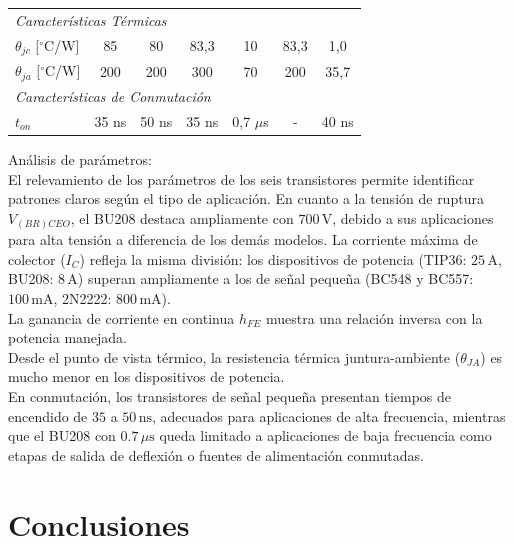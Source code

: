 \documentclass[12pt,a4paper]{article}
\newcommand{\vsample}{\addlinespace}
\begin{document}
\begin{table}[H]
\begin{tabular}{lcccccc}
\multicolumn{7}{l}{\textit{Características Térmicas}} \\ \vsample
$\theta_{jc}$ [$^{\circ}$C/W] & 85 & 80 & 83,3 & 10 & 83,3 & 1,0 \\ \vsample
$\theta_{ja}$ [$^{\circ}$C/W] & 200 & 200 & 300 & 70 & 200 & 35,7 \\ \midrule
\multicolumn{7}{l}{\textit{Características de Conmutación}} \\ \vsample
$t_{on}$ & 35 ns & 50 ns & 35 ns & 0,7 $\mu$s & - & 40 ns \\ \bottomrule
\end{tabular}
\end{table}

Análisis de parámetros: \\
El relevamiento de los parámetros de los seis transistores permite identificar patrones claros según el tipo de
aplicación. En cuanto a la tensión de ruptura $V_{(BR)CEO}$, el BU208 destaca ampliamente con $700\,\text{V}$, debido a
sus aplicaciones para alta tensión a diferencia de los demás modelos. La corriente máxima de colector ($I_C$) refleja la
misma división: los dispositivos de potencia (TIP36: $25\,\text{A}$, BU208: $8\,\text{A}$) superan ampliamente a los de
señal pequeña (BC548 y BC557: $100\,\text{mA}$, 2N2222: $800\,\text{mA}$). \\
La ganancia de corriente en continua $h_{FE}$ muestra una relación inversa con la potencia manejada. \\
Desde el punto de vista térmico, la resistencia térmica juntura-ambiente ($\theta_{JA}$) es mucho menor en los
dispositivos de potencia.
\\
En conmutación, los transistores de señal pequeña presentan tiempos de encendido de $35$ a $50\,\text{ns}$, adecuados
para aplicaciones de alta frecuencia, mientras que el BU208 con $0.7\,\mu\text{s}$ queda limitado a aplicaciones de baja
frecuencia como etapas de salida de deflexión o fuentes de alimentación conmutadas.
\section{Conclusiones}
\end{document}
